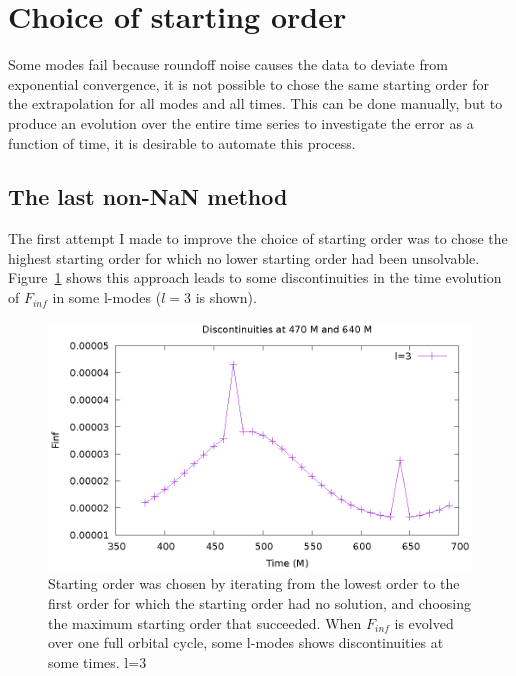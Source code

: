 \section{Choice of starting order}

Some modes fail because roundoff noise causes the data to deviate from exponential convergence, it is not possible to chose the same starting order for the extrapolation for all modes and all times. This can be done manually, but to produce an evolution over the entire time series to investigate the error as a function of time, it is desirable to automate this process.

\subsection{The last non-NaN method}

The first attempt I made to improve the choice of starting order was to chose the highest starting order for which no lower starting order had been unsolvable. Figure~\ref{finfovertimediscont} shows this approach leads to some discontinuities in the time evolution of $F_{inf}$ in some l-modes ($l=3$ is shown). 


\begin{figure}
  \includegraphics{finfovertimel3discontinuities}
  \caption{Starting order was chosen by iterating from the lowest order to the first order for which the starting order had no solution, and choosing the maximum starting order that succeeded. When $F_{inf}$ is evolved over one full orbital cycle, some l-modes shows discontinuities at some times. l=3}
\label{finfovertimediscont}
\end{figure}

